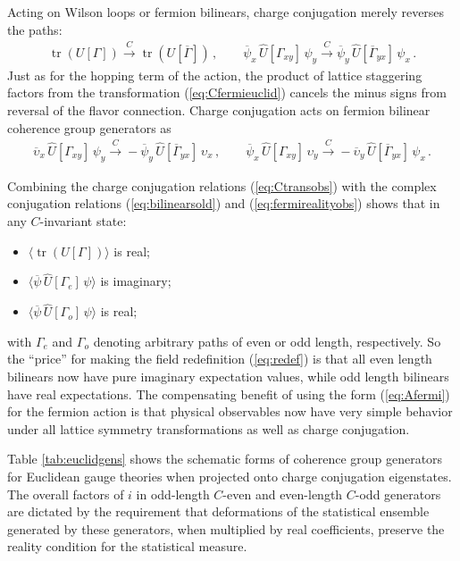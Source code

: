\documentclass [12pt]{article}
\newcommand{\tr}{\mathop{\mathrm{tr}}}
\begin{document}
Acting on Wilson loops or fermion bilinears,
charge conjugation merely reverses the paths:
\begin{align}
    \tr(U[\Gamma])
    \xrightarrow{C}
    \tr(U[\overline\Gamma]) \,,
    \qquad
    \overline\psi_x \, \hat U[\Gamma_{xy}] \, \psi_y
    \xrightarrow{C}
    \overline\psi_y \, \hat U[\overline\Gamma_{yx}] \, \psi_x \,.
\label{eq:Ctransobs}
\end{align}
Just as for the hopping term of the action, the product of 
lattice staggering factors from the transformation (\ref{eq:Cfermieuclid})
cancels the minus signs from reversal of the flavor connection.
Charge conjugation acts on
fermion bilinear coherence group generators as
\begin{align}
    \overline\upsilon_x \, \hat U[\Gamma_{xy}] \, \psi_y
    \xrightarrow{C}
    -\overline\psi_y \, \hat U[\overline\Gamma_{yx}] \, \upsilon_x \,,
    \qquad
    \overline\psi_x \, \hat U[\Gamma_{xy}] \, \upsilon_y
    \xrightarrow{C}
    -\overline\upsilon_y \, \hat U[\overline\Gamma_{yx}] \, \psi_x \,.
\label{eq:Ctransgens}
\end{align}

Combining the charge conjugation relations (\ref{eq:Ctransobs}) with
the complex conjugation relations
(\ref{eq:bilinearsold}) and (\ref{eq:fermirealityobs})
shows that in any $C$-invariant state:
\begin{itemize}\advance\itemsep -3pt
\item $\langle \tr(U[\Gamma]) \rangle$ is real;
\item $\langle \overline\psi \,\hat U[\Gamma_e] \,\psi\rangle$ is imaginary;
\item $\langle \overline\psi \,\hat U[\Gamma_o] \,\psi\rangle$ is real;
\end{itemize}
with $\Gamma_e$ and $\Gamma_o$ denoting arbitrary paths of even or odd length,
respectively.
So the ``price'' for making the field redefinition (\ref{eq:redef})
is that all even length bilinears now have pure imaginary expectation values,
while odd length bilinears have real expectations.
The compensating benefit of using the form (\ref{eq:Afermi}) for the
fermion action is that physical observables now have very simple
behavior under all lattice symmetry transformations as well as
charge conjugation.

Table \ref{tab:euclidgens} shows the schematic forms of
coherence group generators for Euclidean gauge theories
when projected onto charge conjugation eigenstates.
The overall factors of $i$ in odd-length $C$-even
and even-length $C$-odd generators are
dictated by the requirement that deformations of the
statistical ensemble generated by these generators,
when multiplied by real coefficients, preserve
the reality condition for the statistical measure.
\end{document}
